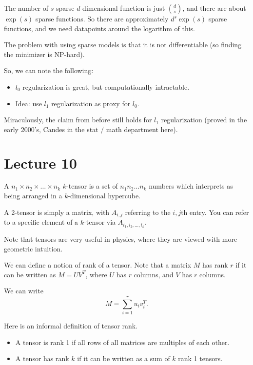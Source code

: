 The number of $s$-sparse $d$-dimensional function is just $\binom{d}{s}$, and there are about $\exp(s)$ sparse functions.  So there are approximately $d^s \exp(s)$ sparse functions, and we need datapoints around the logarithm of this.

The problem with using sparse models is that it is not differentiable (so finding the minimizer is NP-hard).

So, we can note the following:

\begin{itemize}
  \item $l_0$ regularization is great, but computationally intractable.
  \item Idea: use $l_1$ regularization as proxy for $l_0$.
\end{itemize}

Miraculously, the claim from before still holds for $l_1$ regularization (proved in the early 2000's, Candes in the stat / math department here).


\section{Lecture 10}

\begin{definition}
  A $n_1 \times n_2 \times \dots \times n_k$ $k$-tensor is a set of $n_1 n_2 \dots n_k$ numbers which interprets as being arranged in a $k$-dimensional hypercube.
\end{definition}

A 2-tensor is simply a matrix, with $A_{i,j}$ referring to the $i,j$th entry.  You can refer to a specific element of a $k$-tensor via $A_{i_1, i_2, \dots, i_k}$.

Note that tensors are very useful in physics, where they are viewed with more geometric intuition.

We can define a notion of rank of a tensor.  Note that a matrix $M$ has rank $r$ if it can be written as $M = UV^T$, where $U$ has $r$ columns, and $V$ has $r$ columns.

We can write
\[
  M = \sum_{i=1}^{r} u_i v_i^T.
\]

Here is an informal definition of tensor rank.

\begin{itemize}
  \item A tensor is rank 1 if all rows of all matrices are multiples of each other.
  \item A tensor has rank $k$ if it can be written as a sum of $k$ rank 1 tensors.
\end{itemize}

